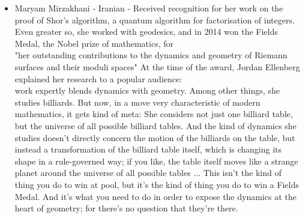 \documentclass{article}
\begin{document}
\begin{itemize}
    \item Maryam Mirzakhani - Iranian - Received recognition for her work on the proof of Shor's algorithm, a quantum algorithm for factorisation of integers. Even greater so, she worked with geodesics, and in 2014 won the Fields Medal, the Nobel prize of mathematics, for \\
    \newline 
    "her outstanding contributions to the dynamics and geometry of Riemann surfaces and their moduli spaces"
    \newline
    At the time of the award, Jordan Ellenberg explained her research to a popular audience:\\
    \newline
    [Her] work expertly blends dynamics with geometry. Among other things, she studies billiards. But now, in a move very characteristic of modern mathematics, it gets kind of meta: She considers not just one billiard table, but the universe of all possible billiard tables. And the kind of dynamics she studies doesn't directly concern the motion of the billiards on the table, but instead a transformation of the billiard table itself, which is changing its shape in a rule-governed way; if you like, the table itself moves like a strange planet around the universe of all possible tables ... This isn't the kind of thing you do to win at pool, but it's the kind of thing you do to win a Fields Medal. And it's what you need to do in order to expose the dynamics at the heart of geometry; for there's no question that they're there.
    \newline

\end{itemize}
\end{document}
